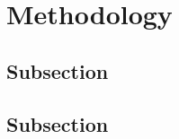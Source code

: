 \section{Methodology}
\label{sec:methodology}

\lipsum[8]

\subsection{Subsection}
\lipsum[8]
\lipsum[8]

\subsection{Subsection}
\lipsum[8]
\lipsum[8]